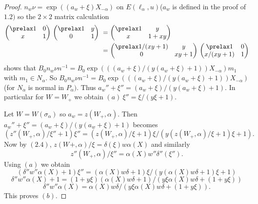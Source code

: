 \documentclass{memo-l}
\theoremstyle{definition}
\theoremstyle{remark}
\numberwithin{section}{chapter}
\numberwithin{equation}{chapter}
\begin{document}
\begin{proof}   $n_{w}{\nu} = \exp((a_{w}+{\xi})X_{-{\alpha}})$ on
$E({\ell}_{{\alpha}},u)$\quad ($a_{w}$ is defined in the proof of $1.2)$ so the $2
\times 2$ matrix calculation
$$\aligned
{\begin{pmatrix} \prelax  1 & 0 \\ x & 1 \end{pmatrix}}\ {\begin{pmatrix} \prelax  1 & y \\ 0 & 1 \end{pmatrix}}\ 
=&\ {\begin{pmatrix} \prelax  
 1 & y \\ x & 1+xy \end{pmatrix}}\\
=&\
{\begin{pmatrix} \prelax  
 1/(xy+1) & y \\ 0 & xy + 1 \end{pmatrix}}\
{\begin{pmatrix} \prelax  
 1 & 0 \\ x/(xy+1) & 1 \end{pmatrix}}
\endaligned$$
shows that $B_{0}n_{w}{\nu}n^{-1} =
B_{0}\exp(((a_{w}+{\xi})/(y(a_{w}+{\xi})+1))X_{-{\alpha}})m_{1}$ with $m_{1}
 \in  N_{{\alpha}}$.  So $B_{0}n_{w}{\nu}n^{-1} =
B_{0}\exp(((a_{w}+{\xi})/(y(a_{w}+{\xi})+1))X_{-{\alpha}})$ (for
$N_{{\alpha}}$ is normal in $P_{{\alpha}})$.  Thus $a_{w}''+{\xi}'' =
(a_{w}+{\xi})/(y(a_{w}+{\xi})+1)$.  In particular for $W = W_{+}$ we obtain
$(a)\  {\xi}'' = {\xi}/(y{\xi}+1)$.

   Let $W = W({\sigma}_{{\alpha}})$ so $a_{w} = z(W_{+},{\alpha})$.  Then
$a_{w}''+{\xi}'' = (a_{w}+{\xi})/(y(a_{w}+{\xi})+1)$ becomes
$$
(z''(W_{+},{\alpha})/{\xi}'' + 1){\xi''} = (z(W_{+},{\alpha})/{\xi} +
1){\xi}/(y(z(W_{+},{\alpha})/{\xi}+1){\xi} + 1) .
$$
Now by $(2.4)$, $z(W_{}+,{\alpha})/{\xi} = {\delta}({\xi})w{\alpha}(X)$ and
similarly $$z''(W_{+},{\alpha})/{\xi}'' = {\alpha}(X)w''{\delta}''({\xi}'').$$  Using
$(a)$ we obtain
$$
({\delta}''w''{\alpha}(X) + 1){\xi}'' =
({\alpha}(X)w{\delta}+1){\xi}/(y({\alpha}(X)w{\delta}+1){\xi}+1)
$$
$$
{\delta}''w''{\alpha}(X) +1 =
(1+y{\xi})({\alpha}(X)w{\delta}+1)/(y{\xi}{\alpha}(X)w{\delta}+(1+y{\xi}))
$$
$$
{\delta}''w''{\alpha}(X) =
{\alpha}(X)w{\delta}/(y{\xi}{\alpha}(X)w{\delta}+(1+y{\xi})).
$$
This proves $(b)$.


\end{proof}
\end{document}
